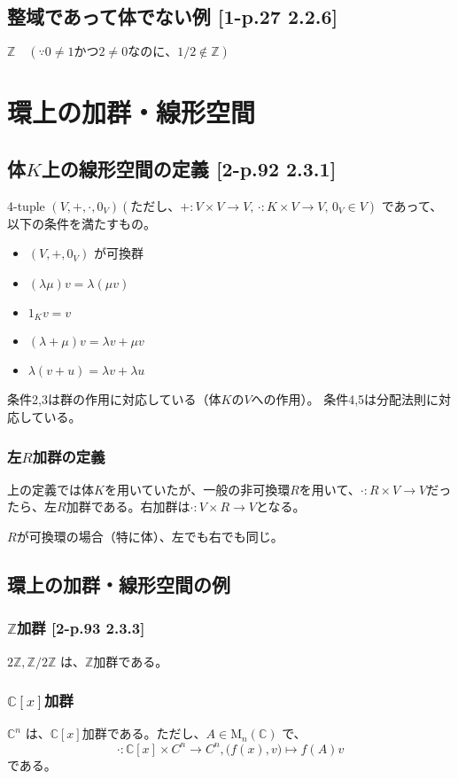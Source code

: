 \documentclass[twocolumn]{jsarticle}
\newcommand{\Z}{\mathbb{Z}}
\newcommand{\C}{\mathbb{C}}
\begin{document}
\subsection{整域であって体でない例 [1-p.27 2.2.6]}
\(\Z \quad (\because 0\neq1かつ2\neq0 なのに、1/2 \notin \Z)\)
\newpage

\section{環上の加群・線形空間}
\subsection{体\(K\)上の線形空間の定義 [2-p.92 2.3.1]}
4-tuple \((V, +, \cdot, 0_V) (ただし、+\colon V\times V \to V,\, \cdot\colon K \times V \to V,\, 0_V \in V)\) であって、以下の条件を満たすもの。\\[-8mm]
\begin{itemize}
    \item \((V, +, 0_V)\) が可換群
    \item \((\lambda \mu) v = \lambda (\mu v)\) 
    \item \(1_K v = v\)
    \item \((\lambda + \mu)v = \lambda v + \mu v\)
    \item \(\lambda(v+u)=\lambda v+ \lambda u\)
\end{itemize}
条件2,3は群の作用に対応している（体\(K\)の\(V\)への作用）。
条件4,5は分配法則に対応している。

\subsubsection{左\(R\)加群の定義}
上の定義では体\(K\)を用いていたが、一般の非可換環\(R\)を用いて、\(\cdot\colon R\times V \to V\)だったら、左\(R\)加群である。右加群は\(\cdot\colon V\times R \to V\)となる。

\(R\)が可換環の場合（特に体）、左でも右でも同じ。

\subsection{環上の加群・線形空間の例}
\subsubsection{\(\Z\)加群 [2-p.93 2.3.3]}
\(2\Z, \Z/2\Z\) は、\(\Z\)加群である。
\subsubsection{\(\C[x]\)加群}
\(\C^n\) は、\(\C[x]\)加群である。ただし、\(A\in \text{M}_n(\C)\) で、
\[
\cdot\colon \C[x]\times C^n \to C^n, \bigl(f(x),v\bigr)\mapsto f(A)v
\]
である。
\end{document}

